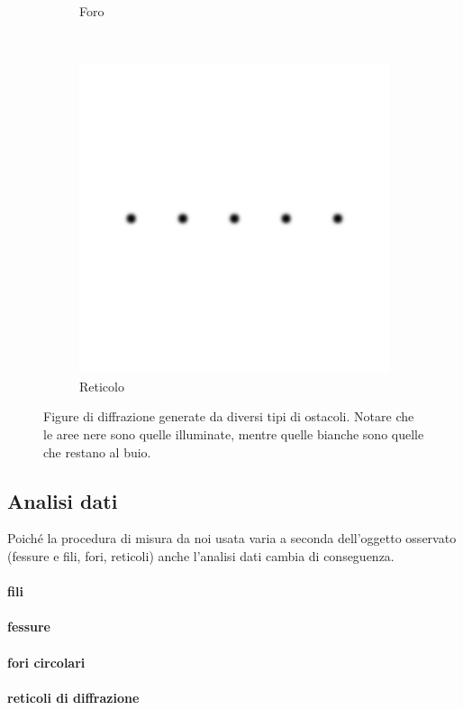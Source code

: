 \begin{figure}[t]
\begin{subfigure}[b]{0.3\textwidth}
        \caption{Foro}
        \label{fig:foro}
    \end{subfigure}
    ~ %
    \begin{subfigure}[b]{0.3\textwidth}
        \includegraphics[width=\textwidth]{f3.png}
        \caption{Reticolo}
        \label{fig:ret}
    \end{subfigure}
    \caption{Figure di diffrazione generate da diversi tipi di ostacoli. Notare che le aree nere sono quelle illuminate,
    mentre quelle bianche sono quelle che restano al buio.}
    \label{fig:diff}
\end{figure}

\subsection{Analisi dati}
Poiché la procedura di misura da noi usata varia a seconda dell'oggetto osservato (fessure e fili, fori, reticoli) anche l'analisi dati cambia di conseguenza.

\paragraph{fili}
\paragraph{fessure}
\paragraph{fori circolari}
\paragraph{reticoli di diffrazione}